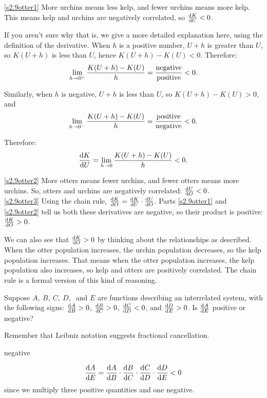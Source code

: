 \begin{solution}
\eqref{s2.9otter1}
More urchins means less kelp, and fewer urchins means more kelp. This means kelp and urchins are negatively correlated, so $\diff{K}{U}<0$.

If you aren't sure why that is, we give a more detailed explanation here, using the definition of the derivative.
When $h$ is a positive number, $U+h$ is greater than $U$, so $K(U+h)$ is less than $U$, hence $K(U+h)-K(U)<0$.
 Therefore:
\[\displaystyle\lim_{h \rightarrow 0^+}\dfrac{K(U+h)-K(U)}{h} = \dfrac{\mbox{negative}}{\mbox{positive}}<0.\]

Similarly, when $h$ is negative, $U+h$ is less than $U$, so $K(U+h)-K(U)>0$, and
\[\displaystyle\lim_{h \rightarrow 0^-}\dfrac{K(U+h)-K(U)}{h}= \dfrac{\mbox{positive}}{\mbox{negative}}<0.\]

Therefore:
\[\ds\diff{K}{U}=\ds\lim_{h \rightarrow 0}\dfrac{K(U+h)-K(U)}{h}<0.\]

\eqref{s2.9otter2} More otters means fewer urchins, and fewer otters means more urchins. So, otters and urchins are negatively correlated: $\diff{U}{O}<0$.\\

\eqref{s2.9otter3} Using the chain rule, $\diff{K}{O} = \diff{K}{U}\cdot\diff{U}{O}$. Parts \eqref{s2.9otter1} and \eqref{s2.9otter2} tell us both these derivatives are negative, so their product is positive: $\diff{K}{O}>0$.

We can also see that $\diff{K}{O}>0$ by thinking about the relationships as described. When the otter population increases, the urchin population decreases, so the kelp population increases. That means when the otter population increases, the kelp population also increases, so kelp and otters are positively correlated. The chain rule is a formal version of this kind of reasoning.
\end{solution}




\begin{question}
Suppose $A,~B,~C,~D,~$ and $E$ are functions describing an interrelated system, with the following signs: $\diff{A}{B}>0$, $\diff{B}{C}>0$, $\diff{C}{D}<0$, and $\diff{D}{E}>0$. Is $\diff{A}{E}$ positive or negative?
\end{question}
\begin{hint}
Remember that Leibniz notation suggests fractional cancellation.
\end{hint}
\begin{answer}
negative
\end{answer}
\begin{solution}
\[\diff{A}{E}=\diff{A}{B}\cdot\diff{B}{C}\cdot\diff{C}{D}\cdot\diff{D}{E}<0\]
since we multiply three positive quantities and one negative.
\end{solution}

